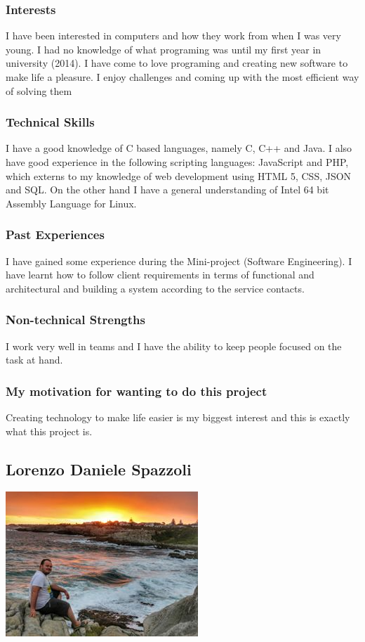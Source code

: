 \documentclass[a4paper,12pt]{article}
\begin{document}
	\subsubsection{Interests}
	I have been interested in computers and how they work from when I was very young. I had no knowledge of what programing was until my first year in university (2014). I have come to love programing and creating new software to make life a pleasure. I enjoy challenges and coming up with the most efficient way of solving them
	
	\subsubsection{Technical Skills}
	I have a good knowledge of C based languages, namely C, C++ and Java. I also have good experience in the following scripting languages: JavaScript and PHP, which externs to my knowledge of web development using HTML 5, CSS, JSON and SQL. On the other hand I have a general understanding of Intel 64 bit Assembly Language for Linux.
	
	\subsubsection{Past Experiences}
	I have gained some experience during the Mini-project (Software Engineering). I have learnt how to follow client requirements in terms of functional and architectural and building a system according to the service contacts. 
	
	\subsubsection{Non-technical Strengths}
	I work very well in teams and I have the ability to keep people focused on the task at hand.
	
	\subsubsection{My motivation for wanting to do this project}
	Creating technology to make life easier is my biggest interest and this is exactly what this project is. 
	
	\newpage
	\subsection{Lorenzo Daniele Spazzoli}
	\includegraphics[scale=0.7]{./Pictures/lorenzo.jpg}\\
\end{document}
